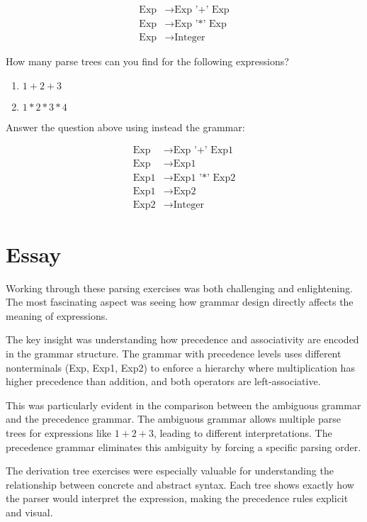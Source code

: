 \documentclass{article}
\theoremstyle{plain}
\theoremstyle{definition}
\theoremstyle{remark}
\begin{document}
\begin{align}
\text{Exp} &\to \text{Exp '+' Exp} \\
\text{Exp} &\to \text{Exp '*' Exp} \\
\text{Exp} &\to \text{Integer}
\end{align}

How many parse trees can you find for the following expressions?

\begin{enumerate}[label=(\alph*)]
    \item $1+2+3$
    \item $1*2*3*4$
\end{enumerate}

Answer the question above using instead the grammar:

\begin{align}
\text{Exp} &\to \text{Exp '+' Exp1} \\
\text{Exp} &\to \text{Exp1} \\
\text{Exp1} &\to \text{Exp1 '*' Exp2} \\
\text{Exp1} &\to \text{Exp2} \\
\text{Exp2} &\to \text{Integer}
\end{align}

\section{Essay}

Working through these parsing exercises was both challenging and enlightening. The most fascinating aspect was seeing how grammar design directly affects the meaning of expressions.

The key insight was understanding how precedence and associativity are encoded in the grammar structure. The grammar with precedence levels uses different nonterminals (Exp, Exp1, Exp2) to enforce a hierarchy where multiplication has higher precedence than addition, and both operators are left-associative.

This was particularly evident in the comparison between the ambiguous grammar and the precedence grammar. The ambiguous grammar allows multiple parse trees for expressions like $1+2+3$, leading to different interpretations. The precedence grammar eliminates this ambiguity by forcing a specific parsing order.

The derivation tree exercises were especially valuable for understanding the relationship between concrete and abstract syntax. Each tree shows exactly how the parser would interpret the expression, making the precedence rules explicit and visual.
\end{document}
